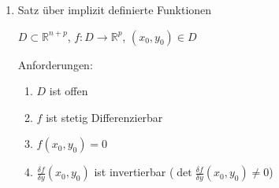 \documentclass[twoside]{article}
\begin{document}
				\begin{enumerate}[1.]
					\item Satz über implizit definierte Funktionen
						
						\begin{math} D \subset \mathbb{R}^{n+p} \end{math}, \begin{math} f: D \to \mathbb{R}^p \end{math}, \begin{math} (x_0, y_0) \in D \end{math}
						
						Anforderungen:
						\begin{enumerate}[-]
							\item \begin{math} D \end{math} ist offen
							\item \begin{math} f \end{math} ist stetig Differenzierbar
							\item \begin{math} f(x_0, y_0) = 0 \end{math}
							\item \begin{math} \frac{\delta f}{\delta y}(x_0, y_0) \end{math} ist invertierbar (\begin{math} \det \frac{\delta f}{\delta y}(x_0, y_0) \ne 0 \end{math})
						\end{enumerate}
						

\end{enumerate}
\end{document}

